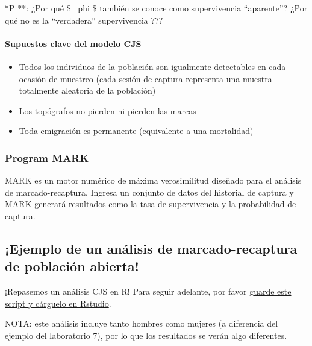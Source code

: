 \documentclass[
]{article}
\providecommand{\tightlist}{%
  \setlength{\itemsep}{0pt}\setlength{\parskip}{0pt}}
\begin{document}
*P **: ¿Por qué \$ ~phi \$ también se conoce como supervivencia
``aparente''? ¿Por qué no es la ``verdadera'' supervivencia ???

\hypertarget{supuestos-clave-del-modelo-cjs}{%
\paragraph{Supuestos clave del modelo
CJS}\label{supuestos-clave-del-modelo-cjs}}

\begin{itemize}
\tightlist
\item
  Todos los individuos de la población son igualmente detectables en
  cada ocasión de muestreo (cada sesión de captura representa una
  muestra totalmente aleatoria de la población)
\item
  Los topógrafos no pierden ni pierden las marcas
\item
  Toda emigración es permanente (equivalente a una mortalidad)
\end{itemize}

\hypertarget{program-mark}{%
\subsubsection{Program MARK}\label{program-mark}}

MARK es un motor numérico de máxima verosimilitud diseñado para el
análisis de marcado-recaptura. Ingresa un conjunto de datos del
historial de captura y MARK generará resultados como la tasa de
supervivencia y la probabilidad de captura.

\hypertarget{ejemplo-de-un-anuxe1lisis-de-marcado-recaptura-de-poblaciuxf3n-abierta}{%
\subsection{¡Ejemplo de un análisis de marcado-recaptura de población
abierta!}\label{ejemplo-de-un-anuxe1lisis-de-marcado-recaptura-de-poblaciuxf3n-abierta}}

¡Repasemos un análisis CJS en R! Para seguir adelante, por favor
\href{LECTURE15.R}{guarde este script y cárguelo en Rstudio}.

NOTA: este análisis incluye tanto hombres como mujeres (a diferencia del
ejemplo del laboratorio 7), por lo que los resultados se verán algo
diferentes.
\end{document}
